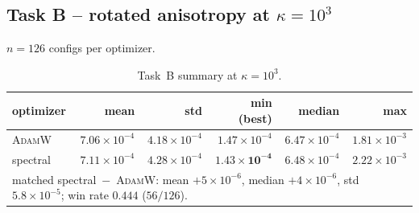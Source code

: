 \documentclass{article}
\newcommand{\Adamw}{\textsc{AdamW}}
\begin{document}
\subsection{Task B -- rotated anisotropy at $\kappa = 10^3$}
$n=126$ configs per optimizer.

\begin{table}[h]
\centering
\caption{Task~B summary at $\kappa=10^3$.}
\label{tab:task_b}
\begin{tabular}{l r r r r r}
\toprule
optimizer & mean & std & min (best) & median & max\\
\midrule
\Adamw\     & $7.06\!\times\!10^{-4}$ & $4.18\!\times\!10^{-4}$ & $1.47\!\times\!10^{-4}$ & $6.47\!\times\!10^{-4}$ & $1.81\!\times\!10^{-3}$\\
spectral    & $7.11\!\times\!10^{-4}$ & $4.28\!\times\!10^{-4}$ & $\mathbf{1.43\!\times\!10^{-4}}$ & $6.48\!\times\!10^{-4}$ & $2.22\!\times\!10^{-3}$\\
\midrule
\multicolumn{6}{l}{matched spectral~$-$~\Adamw: mean $+5\!\times\!10^{-6}$,
median $+4\!\times\!10^{-6}$, std $5.8\!\times\!10^{-5}$;
win rate $0.444$ ($56/126$).}\\
\bottomrule
\end{tabular}
\end{table}
\end{document}
